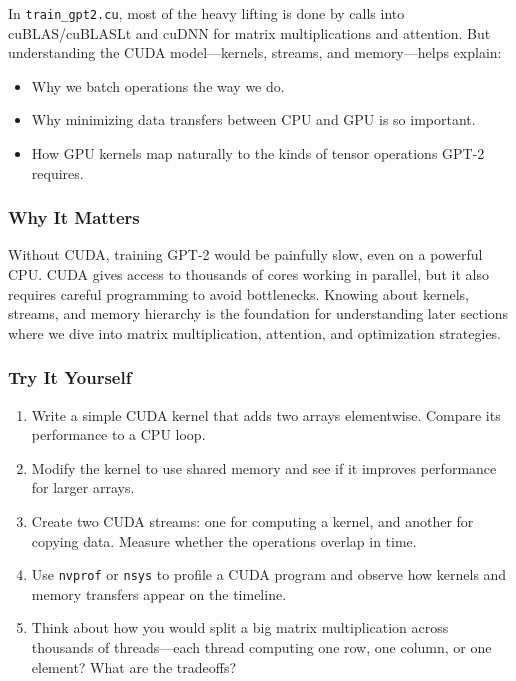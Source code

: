 \documentclass[
  letterpaper,
  DIV=11,
  numbers=noendperiod]{scrreprt}
\providecommand{\tightlist}{%
  \setlength{\itemsep}{0pt}\setlength{\parskip}{0pt}}
\begin{document}
In \texttt{train\_gpt2.cu}, most of the heavy lifting is done by calls
into cuBLAS/cuBLASLt and cuDNN for matrix multiplications and attention.
But understanding the CUDA model---kernels, streams, and memory---helps
explain:

\begin{itemize}
\tightlist
\item
  Why we batch operations the way we do.
\item
  Why minimizing data transfers between CPU and GPU is so important.
\item
  How GPU kernels map naturally to the kinds of tensor operations GPT-2
  requires.
\end{itemize}

\subsubsection{Why It Matters}\label{why-it-matters-37}

Without CUDA, training GPT-2 would be painfully slow, even on a powerful
CPU. CUDA gives access to thousands of cores working in parallel, but it
also requires careful programming to avoid bottlenecks. Knowing about
kernels, streams, and memory hierarchy is the foundation for
understanding later sections where we dive into matrix multiplication,
attention, and optimization strategies.

\subsubsection{Try It Yourself}\label{try-it-yourself-49}

\begin{enumerate}
\def\labelenumi{\arabic{enumi}.}
\tightlist
\item
  Write a simple CUDA kernel that adds two arrays elementwise. Compare
  its performance to a CPU loop.
\item
  Modify the kernel to use shared memory and see if it improves
  performance for larger arrays.
\item
  Create two CUDA streams: one for computing a kernel, and another for
  copying data. Measure whether the operations overlap in time.
\item
  Use \texttt{nvprof} or \texttt{nsys} to profile a CUDA program and
  observe how kernels and memory transfers appear on the timeline.
\item
  Think about how you would split a big matrix multiplication across
  thousands of threads---each thread computing one row, one column, or
  one element? What are the tradeoffs?
\end{enumerate}
\end{document}
